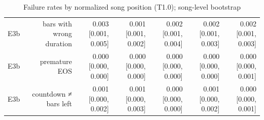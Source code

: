 \begin{table}[t]
\begin{tabular}{lrrrrrr}
E3b & bars with wrong duration & 0.003 [0.001, 0.005] & 0.001 [0.001, 0.002] & 0.002 [0.001, 0.004] & 0.002 [0.001, 0.003] & 0.002 [0.001, 0.003] \\
E3b & premature EOS & 0.000 [0.000, 0.000] & 0.000 [0.000, 0.000] & 0.000 [0.000, 0.000] & 0.000 [0.000, 0.000] & 0.000 [0.000, 0.001] \\
E3b & countdown ≠ bars left & 0.001 [0.000, 0.002] & 0.001 [0.000, 0.003] & 0.000 [0.000, 0.000] & 0.001 [0.000, 0.002] & 0.000 [0.000, 0.001] \\
\bottomrule
\end{tabular}
\caption{Failure rates by normalized song position (T1.0); song-level bootstrap}
\label{tab:long_range_T10}
\end{table}
